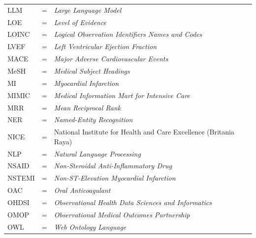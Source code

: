 \begin{longtable}{llp{3.6in}}
	LLM     & \hspace{1cm} = & \emph{Large Language Model} \\
	LOE     & \hspace{1cm} = & \emph{Level of Evidence} \\
	LOINC   & \hspace{1cm} = & \emph{Logical Observation Identifiers Names and Codes} \\
	LVEF    & \hspace{1cm} = & \emph{Left Ventricular Ejection Fraction} \\
	MACE    & \hspace{1cm} = & \emph{Major Adverse Cardiovascular Events} \\
	MeSH    & \hspace{1cm} = & \emph{Medical Subject Headings} \\
	MI      & \hspace{1cm} = & \emph{Myocardial Infarction} \\
	MIMIC   & \hspace{1cm} = & \emph{Medical Information Mart for Intensive Care} \\
	MRR     & \hspace{1cm} = & \emph{Mean Reciprocal Rank} \\
	NER     & \hspace{1cm} = & \emph{Named-Entity Recognition} \\
	NICE    & \hspace{1cm} = & National Institute for Health and Care Excellence (Britania Raya) \\
	NLP     & \hspace{1cm} = & \emph{Natural Language Processing} \\
	NSAID   & \hspace{1cm} = & \emph{Non-Steroidal Anti-Inflammatory Drug} \\
	NSTEMI  & \hspace{1cm} = & \emph{Non-ST-Elevation Myocardial Infarction} \\
	OAC     & \hspace{1cm} = & \emph{Oral Anticoagulant} \\
	OHDSI   & \hspace{1cm} = & \emph{Observational Health Data Sciences and Informatics} \\
	OMOP    & \hspace{1cm} = & \emph{Observational Medical Outcomes Partnership} \\
	OWL     & \hspace{1cm} = & \emph{Web Ontology Language} \\

\end{longtable}
